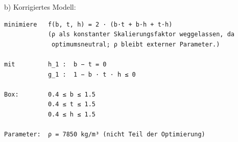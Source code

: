 \documentclass[11pt, a4paper]{article}
\begin{document}
b) Korrigiertes Modell:


\begin{lstlisting}
minimiere   f(b, t, h) = 2 · (b·t + b·h + t·h)
            (ρ als konstanter Skalierungsfaktor weggelassen, da
             optimumsneutral; ρ bleibt externer Parameter.)

mit         h_1 :  b − t = 0
            g_1 :  1 − b · t · h ≤ 0

Box:        0.4 ≤ b ≤ 1.5
            0.4 ≤ t ≤ 1.5
            0.4 ≤ h ≤ 1.5

Parameter:  ρ = 7850 kg/m³ (nicht Teil der Optimierung)
\end{lstlisting}





\end{document}
